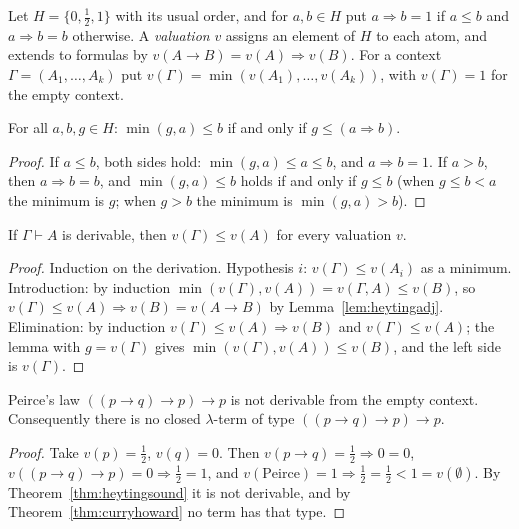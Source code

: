 \begin{definition}\label{def:heyting3}
Let $H=\{0,\frac12,1\}$ with its usual order, and for $a,b\in H$ put $a\Rightarrow b=1$ if $a\le b$ and $a\Rightarrow b=b$ otherwise. A \emph{valuation} $v$ assigns an element of $H$ to each atom, and extends
to formulas by $v(A\to B)=v(A)\Rightarrow v(B)$. For a context $\Gamma=(A_1,\dots,A_k)$ put $v(\Gamma)=\min(v(A_1),\dots,v(A_k))$, with $v(\Gamma)=1$ for the empty context.
\end{definition}

\begin{lemma}\label{lem:heytingadj}
For all $a,b,g\in H$: $\min(g,a)\le b$ if and only if $g\le(a\Rightarrow b)$.
\end{lemma}

\begin{proof}
If $a\le b$, both sides hold: $\min(g,a)\le a\le b$, and $a\Rightarrow b=1$. If $a>b$, then $a\Rightarrow b=b$, and $\min(g,a)\le b$ holds if and only if $g\le b$ (when $g\le b<a$ the minimum is $g$; when $g>b$ the minimum is $\min(g,a)>b$).
\end{proof}

\begin{theorem}[soundness]\label{thm:heytingsound}
If $\Gamma\vdash A$ is derivable, then $v(\Gamma)\le v(A)$ for every valuation $v$.
\end{theorem}

\begin{proof}
Induction on the derivation. Hypothesis $i$: $v(\Gamma)\le v(A_i)$ as a minimum. Introduction: by induction $\min(v(\Gamma),v(A))=v(\Gamma,A)\le v(B)$, so $v(\Gamma)\le v(A)\Rightarrow v(B)=v(A\to B)$ by Lemma~\ref{lem:heytingadj}.
Elimination: by induction $v(\Gamma)\le v(A)\Rightarrow v(B)$ and $v(\Gamma)\le v(A)$; the lemma with $g=v(\Gamma)$ gives $\min(v(\Gamma),v(A))\le v(B)$, and the left side is $v(\Gamma)$.
\end{proof}

\begin{corollary}\label{cor:peirce}
Peirce's law $((p\to q)\to p)\to p$ is not derivable from the empty context. Consequently there is no closed $\lambda$-term of type $((p\to q)\to p)\to p$.
\end{corollary}

\begin{proof}
Take $v(p)=\frac12$, $v(q)=0$. Then $v(p\to q)=\frac12\Rightarrow0=0$, $v((p\to q)\to p)=0\Rightarrow\frac12=1$, and $v(\text{Peirce})=1\Rightarrow\frac12=\frac12<1=v(\emptyset)$. By Theorem~\ref{thm:heytingsound}
it is not derivable, and by Theorem~\ref{thm:curryhoward} no term has that type.
\end{proof}

